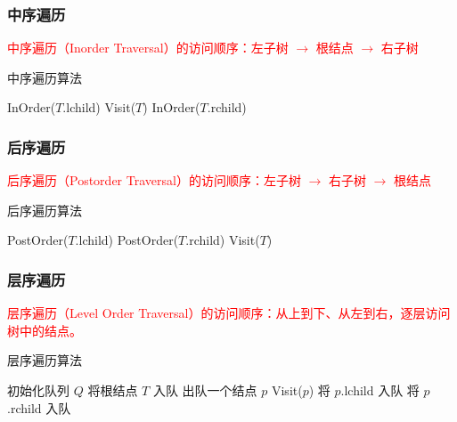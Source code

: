 \documentclass{../../note}
\begin{document}
\subsubsection{中序遍历}
\textcolor{red}{中序遍历（Inorder Traversal）的访问顺序：左子树 $\rightarrow$ 根结点 $\rightarrow$ 右子树}

\begin{algorithm}
\caption{中序遍历算法}
\begin{algorithmic}[1]
  \State InOrder($T$.lchild)  
  \State Visit($T$)           
  \State InOrder($T$.rchild)  
  \EndIf
  \EndProcedure
\end{algorithmic}
\end{algorithm}

\subsubsection{后序遍历}
\textcolor{red}{后序遍历（Postorder Traversal）的访问顺序：左子树 $\rightarrow$ 右子树 $\rightarrow$ 根结点}

\begin{algorithm}
\caption{后序遍历算法}
\begin{algorithmic}[1]
  \State PostOrder($T$.lchild) 
  \State PostOrder($T$.rchild) 
  \State Visit($T$)            
  \EndIf
  \EndProcedure
\end{algorithmic}
\end{algorithm}

\subsubsection{层序遍历}
\textcolor{red}{层序遍历（Level Order Traversal）的访问顺序：从上到下、从左到右，逐层访问树中的结点。}

\begin{algorithm}
\caption{层序遍历算法}
\begin{algorithmic}[1]
  \State 初始化队列 $Q$
  \State 将根结点 $T$ 入队
  \State 出队一个结点 $p$
  \State Visit($p$)
  \State 将 $p$.lchild 入队
  \EndIf
  \State 将 $p$.rchild 入队
  \EndIf
  \EndWhile
  \EndIf
  \EndProcedure
\end{algorithmic}
\end{algorithm}
\end{document}
